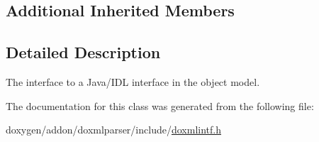 \subsection*{Additional Inherited Members}


\subsection{Detailed Description}
The interface to a Java/\+I\+DL interface in the object model. 

The documentation for this class was generated from the following file\+:\begin{DoxyCompactItemize}
\item 
doxygen/addon/doxmlparser/include/\mbox{\hyperlink{include_2doxmlintf_8h}{doxmlintf.\+h}}\end{DoxyCompactItemize}
